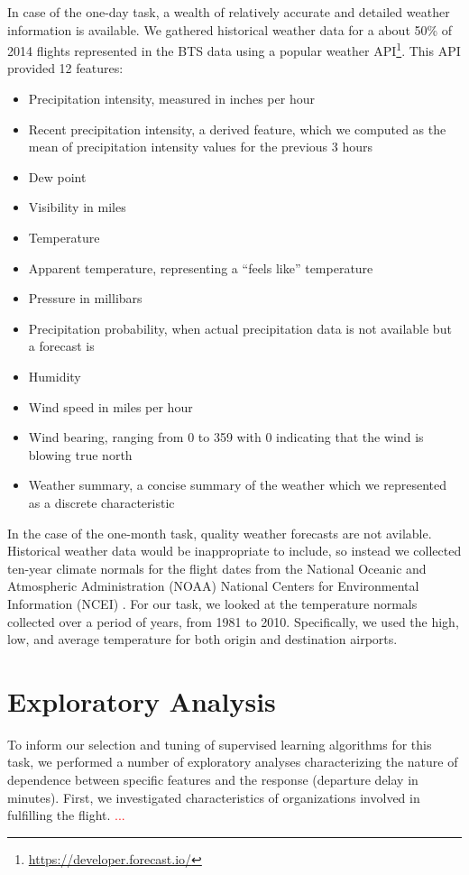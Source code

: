 \documentclass[twocolumn]{article}
\begin{document}
In case of the one-day task, a wealth of relatively accurate and detailed weather information is available. We gathered historical weather data for a about 50\% of 2014 flights represented in the BTS data using a popular weather API\footnote{\url{https://developer.forecast.io/}}. This API provided 12 features:
\begin{itemize}
\item Precipitation intensity, measured in inches per hour
\item Recent precipitation intensity, a derived feature, which we computed as the mean of precipitation intensity values for the previous 3 hours
\item Dew point
\item Visibility in miles
\item Temperature
\item Apparent temperature, representing a ``feels like'' temperature
\item Pressure in millibars
\item Precipitation probability, when actual precipitation data is not available but a forecast is
\item Humidity
\item Wind speed in miles per hour
\item Wind bearing, ranging from 0 to 359 with 0 indicating that the wind is blowing true north
\item Weather summary, a concise summary of the weather which we represented as a discrete characteristic
\end{itemize}

In the case of the one-month task, quality weather forecasts are not avilable. Historical weather data would be inappropriate to include, so instead we collected ten-year climate normals for the flight dates from the National Oceanic and Atmospheric Administration (NOAA) National Centers for Environmental Information (NCEI) \citep{noaaclimatedata}.  For our task, we looked at the temperature normals collected over a period of years, from 1981 to 2010. Specifically, we used the high, low, and average temperature for both origin and destination airports.

\section{Exploratory Analysis}
\label{sec:exploratory}

To inform our selection and tuning of supervised learning algorithms for this task, we performed a number of exploratory analyses characterizing the nature of dependence between specific features and the response (departure delay in minutes). First, we investigated characteristics of organizations involved in fulfilling the flight. \textcolor{red}{...}
\end{document}
